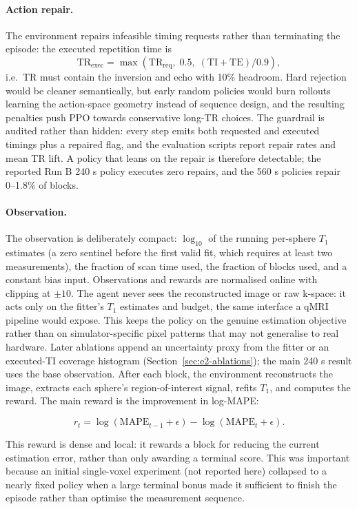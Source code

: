 \paragraph{Action repair.} The environment repairs infeasible timing requests
rather than terminating the episode: the executed repetition time is
\[
    \mathrm{TR}_\mathrm{exec} = \max\!\left(\mathrm{TR}_\mathrm{req},\;
    0.5,\; (\mathrm{TI}+\mathrm{TE})/0.9\right),
\]
i.e.\ TR must contain the inversion and echo with 10\% headroom. Hard
rejection would be cleaner semantically, but early random policies would burn
rollouts learning the action-space geometry instead of sequence design, and
the resulting penalties push PPO towards conservative long-TR choices. The
guardrail is audited rather than hidden: every step emits both requested and
executed timings plus a repaired flag, and the evaluation scripts report
repair rates and mean TR lift. A policy that leans on the repair is therefore
detectable; the reported Run B 240 s policy executes zero repairs, and the
560 s policies repair 0--1.8\% of blocks.

\paragraph{Observation.} The observation is deliberately compact:
$\log_{10}$ of the running per-sphere $T_1$ estimates (a zero sentinel before
the first valid fit, which requires at least two measurements), the fraction
of scan time used, the fraction of blocks used, and a constant bias input.
Observations and rewards are normalised online with clipping at $\pm10$. The
agent never sees the reconstructed image or raw k-space: it acts only on the
fitter's $T_1$ estimates and budget, the same interface a qMRI pipeline would
expose. This keeps the policy on the genuine estimation objective rather than
on simulator-specific pixel patterns that may not generalise to real hardware.
Later ablations append an uncertainty proxy from the fitter or an
executed-TI coverage histogram (Section~\ref{sec:e2-ablations}); the main
240 s result uses the base observation. After each
block, the environment reconstructs the image, extracts each sphere's
region-of-interest signal, refits $T_1$, and computes the reward. The main
reward is the improvement in log-MAPE:

\[
    r_t =
    \log\!\left(\mathrm{MAPE}_{t-1} + \epsilon\right)
    - \log\!\left(\mathrm{MAPE}_{t} + \epsilon\right).
\]

This reward is dense and local: it rewards a block for reducing the current
estimation error, rather than only awarding a terminal score. This was important
because an initial single-voxel experiment (not reported here) collapsed to a
nearly fixed policy when a large terminal bonus made it sufficient to finish the
episode rather than optimise the measurement sequence.

